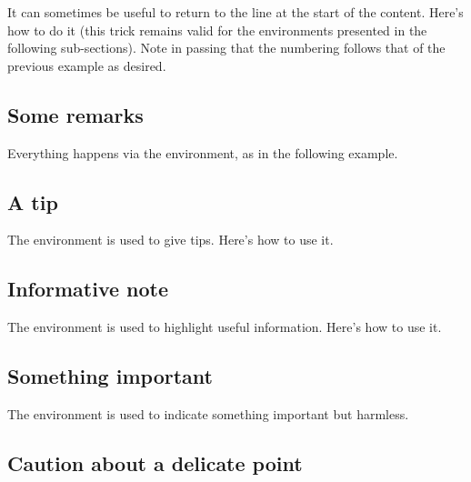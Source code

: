 

\begin{tdoctip}
    It can sometimes be useful to return to the line at the start of the content. Here's how to do it (this trick remains valid for the environments presented in the following sub-sections). Note in passing that the numbering follows that of the previous example as desired.

\end{tdoctip}


\subsection{Some remarks}

Everything happens via the  environment, as in the following example.



\subsection{A tip}

The  environment is used to give tips. Here's how to use it.



\subsection{Informative note}

The  environment is used to highlight useful information. Here's how to use it.




\subsection{Something important}

The  environment is used to indicate something important but harmless.


\subsection{Caution about a delicate point}

